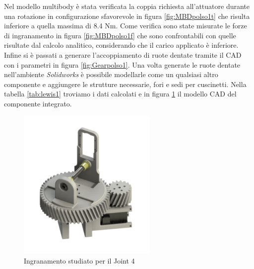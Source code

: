 \documentclass[%
corpo=11pt,
twoside,
 stile=classica,
oldstyle,
greek,%
]{toptesi}
\begin{document}
		
		Nel modello multibody è stata verificata la coppia richiesta all'attuatore durante una rotazione in configurazione sfavorevole in figura \ref{fig:MBDpolso1t} che risulta inferiore a quella massima di 8.4 Nm. Come verifica sono state misurate le forze di ingranamento in figura \ref{fig:MBDpolso1f} che sono confrontabili con quelle risultate dal calcolo analitico, considerando che il carico applicato è inferiore. Infine si è passati a generare l'accoppiamento di ruote dentate tramite il CAD con i parametri in figura \ref{fig:Gearpolso1}. Una volta generate le ruote dentate nell'ambiente \textit{Solidworks} è possibile modellarle come un qualsiasi altro componente e aggiungere le strutture necessarie, fori e sedi per cuscinetti.  
		Nella tabella \ref{tab:lewis1} troviamo i dati calcolati e in figura \ref{fig:wrist1} il modello CAD del componente integrato. 
		\begin{figure} [H]
			\centering
			\includegraphics[width=0.6\textwidth]{Plots/POLSO1/wrist1.png}
			\caption{Ingranamento studiato per il Joint 4}
			\label{fig:wrist1}
		\end{figure} 
		
\end{document}

